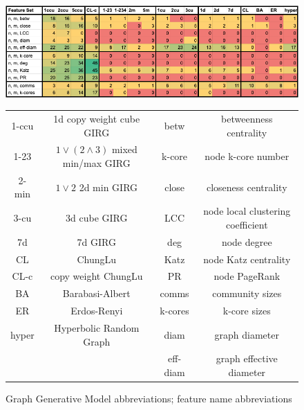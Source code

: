 \begin{figure}
    \centering
    \includegraphics[width=\textwidth]{./figures/Blasius_framework_table.png}
    \caption{\cite{blasius2018towards} GGM comparison framework on Facebook graphs, extended to different GIRG models. Classification accuraciese by SVM use various feature sets. We chose to focus on feature sets involving one core feature (mean, quartile and standard deviation statistics) on top of just number of nodes and edges. If just one of mean/median is used, accuracies are often lower, sometimes even in $50\%-70\%$. $50\%$ is the best possible validation of a GGM as indistinguishable from real data, and is only achieved for feature set $n, m, LCC \;\text{mean}$ (by GIRGs and not the other none geometric GGMs). Some models are missing from the table e.g. 3d-6d GIRGs as their results follow a trend from low to high dimension.
    }
    \label{fig:blasius_framework_table}
    \vspace{1em}
    \centering
    \begin{tabular}{|c|c||c|c|}
        \hline
        1-ccu & 1d copy weight cube GIRG 
        & betw & betweenness centrality
        \\
        1-23 & $1 \lor (2 \land 3)$ mixed min/max GIRG
        & k-core & node k-core number
        \\
        2-min & $1 \lor 2$ 2d min GIRG
        & close & closeness centrality
        \\
        3-cu & 3d cube GIRG
        & LCC & node local clustering coefficient
        \\
        7d & 7d GIRG
        & deg & node degree
        \\
        CL & ChungLu
        & Katz & node Katz centrality
        \\
        CL-c & copy weight ChungLu
        & PR & node PageRank
        \\
        BA & Barabasi-Albert
        & comms & community sizes
        \\
        ER & Erdos-Renyi
        & k-cores & k-core sizes
        \\
        hyper & Hyperbolic Random Graph &
        diam & graph diameter
        \\
        && eff-diam & graph effective diameter\\
        \hline
    \end{tabular}
    \caption{Graph Generative Model abbreviations; feature name abbreviations}
\end{figure}

